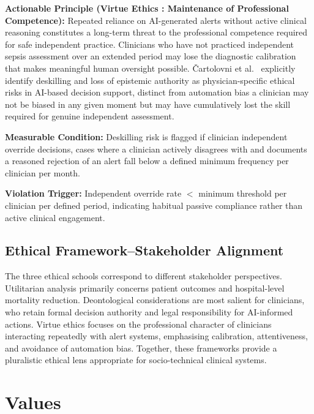 \documentclass[]{UCD_CS_41820_Report}
\begin{document}
\textbf{Actionable Principle (Virtue Ethics : Maintenance of Professional Competence):}
Repeated reliance on AI-generated alerts without active clinical reasoning
constitutes a long-term threat to the professional competence required for safe
independent practice. Clinicians who have not practiced independent sepsis assessment
over an extended period may lose the diagnostic calibration that makes meaningful
human oversight possible. \v{C}artolovni et al.\ \cite{cartoloni2022} explicitly
identify deskilling and loss of epistemic authority as physician-specific ethical
risks in AI-based decision support, distinct from automation bias a clinician may
not be biased in any given moment but may have cumulatively lost the skill required
for genuine independent assessment.\par

\medskip
\textbf{Measurable Condition:} Deskilling risk is flagged if clinician independent
override decisions, cases where a clinician actively disagrees with and documents
a reasoned rejection of an alert fall below a defined minimum frequency per
clinician per month.\par

\medskip
\textbf{Violation Trigger:} Independent override rate $<$ minimum threshold per
clinician per defined period, indicating habitual passive compliance rather than
active clinical engagement.\par

\subsection*{Ethical Framework--Stakeholder Alignment}

The three ethical schools correspond to different stakeholder perspectives.
Utilitarian analysis primarily concerns patient outcomes and hospital-level mortality
reduction. Deontological considerations are most salient for clinicians, who retain
formal decision authority and legal responsibility for AI-informed actions. Virtue
ethics focuses on the professional character of clinicians interacting repeatedly
with alert systems, emphasising calibration, attentiveness, and avoidance of
automation bias. Together, these frameworks provide a pluralistic ethical lens
appropriate for socio-technical clinical systems.

\section{Values}
\end{document}
